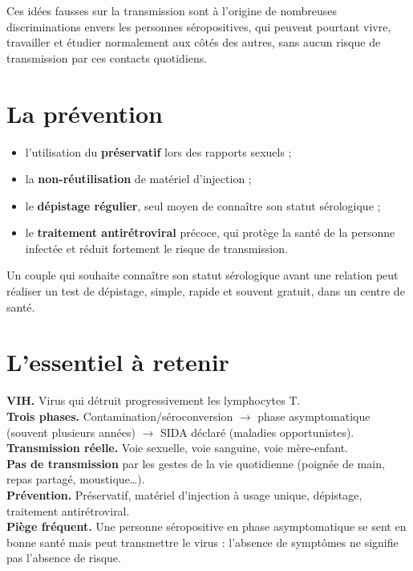 \begin{remarque}
Ces idées fausses sur la transmission sont à l'origine de nombreuses discriminations
envers les personnes séropositives, qui peuvent pourtant vivre, travailler et étudier
normalement aux côtés des autres, sans aucun risque de transmission par ces contacts
quotidiens.
\end{remarque}

\section{La prévention}

\begin{propriete}
\begin{itemize}
\item l'utilisation du \textbf{préservatif} lors des rapports sexuels ;
\item la \textbf{non-réutilisation} de matériel d'injection ;
\item le \textbf{dépistage régulier}, seul moyen de connaître son statut sérologique ;
\item le \textbf{traitement antirétroviral} précoce, qui protège la santé de la personne
infectée et réduit fortement le risque de transmission.
\end{itemize}
\end{propriete}

\begin{exemple}
Un couple qui souhaite connaître son statut sérologique avant une relation peut réaliser
un test de dépistage, simple, rapide et souvent gratuit, dans un centre de santé.
\end{exemple}

\section{L'essentiel à retenir}

\begin{synthese}
\textbf{VIH.} Virus qui détruit progressivement les lymphocytes T.\\[4pt]
\textbf{Trois phases.} Contamination/séroconversion $\to$ phase asymptomatique (souvent
plusieurs années) $\to$ SIDA déclaré (maladies opportunistes).\\[4pt]
\textbf{Transmission réelle.} Voie sexuelle, voie sanguine, voie mère-enfant.\\[4pt]
\textbf{Pas de transmission} par les gestes de la vie quotidienne (poignée de main, repas
partagé, moustique\dots).\\[4pt]
\textbf{Prévention.} Préservatif, matériel d'injection à usage unique, dépistage,
traitement antirétroviral.\\[4pt]
\textbf{Piège fréquent.} Une personne séropositive en phase asymptomatique se sent en
bonne santé mais peut transmettre le virus : l'absence de symptômes ne signifie pas
l'absence de risque.
\end{synthese}

